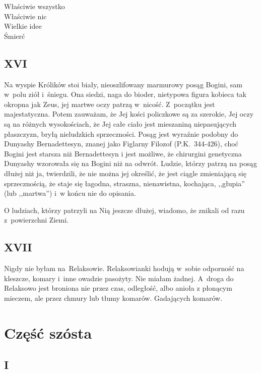\documentclass[oneside,polish,12pt,sfheadings]{mwbk}
\begin{document}
Właściwie wszystko\\

Właściwie nic\\

Wielkie idee\\

Śmierć

\chapter{XVI}

Na wyspie Królików stoi biały, nieoszlifowany marmurowy posąg Bogini,
sam w~polu ziół i~śniegu. Ona siedzi, naga do bioder, nietypowa figura
kobieca tak okropna jak Zeus, jej martwe oczy patrzą w~nicość. Z~początku
jest majestatyczna. Potem zauważam, że Jej kości policzkowe są za
szerokie, Jej oczy są na różnych wysokościach, że Jej całe ciało jest
mieszaniną niepasujących płaszczyzn, bryłą nieludzkich sprzeczności.
Posąg jest wyraźnie podobny do Dunyashy Bernadettesyn, znanej jako
Figlarny Filozof (P.K.~344-426), choć Bogini jest starsza niż Bernadettesyn
i jest możliwe, że chirurgini genetyczna Dunyashy wzorowała się na
Bogini niż na odwrót. Ludzie, którzy patrzą na posąg dłużej niż ja,
twierdzili, że nie można jej określić, że jest ciągle zmieniającą
się sprzecznością, że staje się łagodna, straszna, nienawistna, kochająca,
,,głupia'' (lub ,,martwa'') i~w końcu nie do opisania.

O ludziach, którzy patrzyli na Nią jeszcze dłużej, wiadomo, że znikali
od razu z~powierzchni Ziemi.

\chapter{XVII}

Nigdy nie byłam na~Relaksowie. Relaksowianki hodują w~sobie odporność
na kleszcze, komary i~inne owadzie pasożyty. Nie miałam żadnej. A~droga do Relaksowo jest broniona nie przez czas, odległość, albo anioła
z płonącym mieczem, ale przez chmury lub tłumy komarów. Gadających
komarów.

\part*{Część szósta}

\chapter{I}
\end{document}
